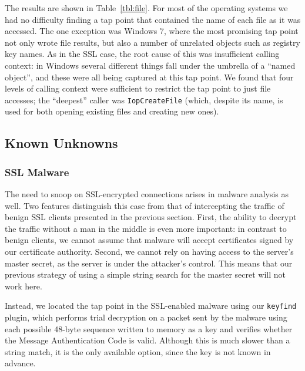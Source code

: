 The results are shown in Table~\ref{tbl:file}. For most of the operating
systems we had no difficulty finding a tap point that contained the name
of each file as it was accessed. The one exception was Windows 7, where
the most promising tap point not only wrote file results, but also a
number of unrelated objects such as registry key names. As in the SSL
case, the root cause of this was insufficient calling context: in
Windows several different things fall under the umbrella of a ``named
object'', and these were all being captured at this tap point. We found
that four levels of calling context were sufficient to restrict the tap
point to just file accesses; the ``deepest'' caller was
\texttt{IopCreateFile} (which, despite its name, is used for both
opening existing files and creating new ones).

\subsection{Known Unknowns}
\subsubsection{SSL Malware}
\label{sec:eval:subsec:sslmal}

The need to snoop on SSL-encrypted connections arises in malware
analysis as well. Two features distinguish this case from that of
intercepting the traffic of benign SSL clients presented in the previous
section. First, the ability to decrypt the traffic without a man in the
middle is even more important: in contrast to benign clients, we cannot
assume that malware will accept certificates signed by our certificate
authority. Second, we cannot rely on having access to the server's
master secret, as the server is under the attacker's control. This means
that our previous strategy of using a simple string search for the
master secret will not work here.

Instead, we located the tap point in the SSL-enabled malware
using our \texttt{keyfind} plugin, which performs trial decryption on a
packet sent by the malware using each possible 48-byte sequence written
to memory as a key and verifies whether the Message Authentication Code
is valid. Although this is much slower than a string match, it is the
only available option, since the key is not known in advance.

